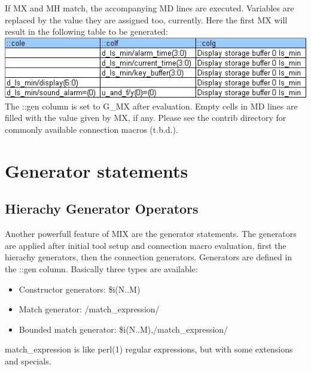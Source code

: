 \documentclass[a4paper,12pt]{article}
\begin{document}
\newline
If MX and MH match, the accompanying MD lines are executed. Variables are replaced by the value they are assigned too, currently. Here the first MX will result in the following table to be generated:\newline
\includegraphics[scale=0.66]{images/macro_out.jpg}\\
The ::gen column is set to G\_MX after evaluation. Empty cells in MD lines are filled with the value given by MX, if any.\newline
\newline
Please see the contrib directory for commonly available connection macros (t.b.d.).


\section{Generator statements}
\subsection{Hierachy Generator Operators}
Another powerfull feature of MIX are the generator statements. The generators are applied after initial tool setup and connection macro evaluation, first the hierachy generators, then the connection generators.\newline
\newline
Generators are defined in the ::gen column. Basically three types are available:\newline
\begin{itemize}
\item{ Constructor generators: \$i(N..M)}
\item{ Match generator: /match\_expression/}
\item{ Bounded match generator: \$i(N..M),/match\_expression/}
\end{itemize}
match\_expression is like perl(1) regular expressions, but with some extensions and specials.\newline
\end{document}
